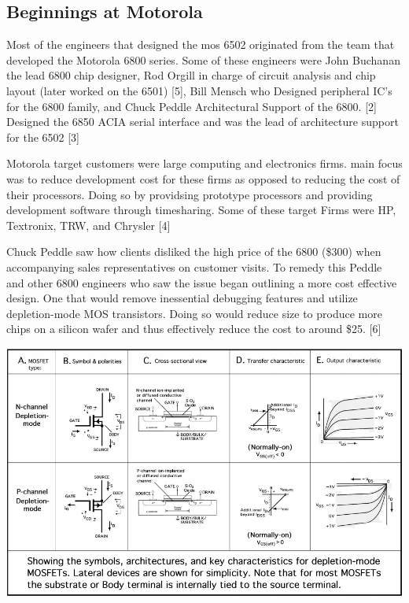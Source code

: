 \documentclass[journal]{IEEEtran}
\begin{document}
\subsection{Beginnings at Motorola}
Most of the engineers that designed the mos 6502 originated from the team 
that developed the Motorola 6800 series.  Some of these engineers were John 
Buchanan the lead 6800 chip designer, Rod Orgill in charge of circuit analysis 
and chip layout (later worked on the 6501) [5], Bill Mensch who Designed 
peripheral IC's for the 6800 family, and Chuck Peddle Architectural Support of the 6800.
[2]  Designed the 6850 ACIA serial interface  and was the lead of architecture support 
for the 6502 [3]

Motorola target customers were large computing and electronics firms.
main focus was to reduce development cost for these firms as opposed to 
reducing the cost of their processors.  Doing so by providsing prototype 
processors and providing development software through timesharing.  
Some of these target Firms were HP, Textronix, TRW, and Chrysler [4]

Chuck Peddle saw how clients disliked the high price of the 6800 (\$300) when 
accompanying sales representatives on customer visits. To remedy this Peddle and
other 6800 engineers who saw the issue began outlining a more cost effective design.
One that would remove inessential debugging features and utilize depletion-mode MOS 
transistors.  Doing so would reduce size to produce more chips on a silicon wafer and 
thus effectively reduce the cost to around \$25. [6]\newline

\centerline{\includegraphics[scale=0.265]{images/Depletion_Mode_Table.png}}
\end{document}
